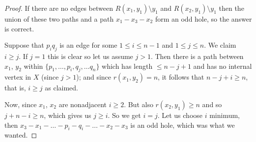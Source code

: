 \begin{proof}
	If there are no edges between $R(x_1, y_1) \setminus y_1$ and $R(x_2, y_1) \setminus y_1$ then the union of these two paths and a path $x_1-x_3-x_2$ form an odd hole, so the answer is correct.

	Suppose that $p_iq_j$ is an edge for some $1\leq i \leq n-1$ and $1 \leq j \leq n$. We claim $i \geq j$. If $j = 1$ this is clear so let us assume $j > 1$. Then there is a path between $x_1$, $y_2$ within $\{p_1, \ldots , p_i, q_j, \ldots q_n\}$ which has length $\leq n-j+1$ and has no internal vertex in $X$ (since $j > 1$); and since $r(x_1, y_2) = n$, it follows that $n-j+i \geq n$, that is, $i \geq j$ as claimed.

	Now, since $x_1$, $x_2$ are nonadjacent $i \geq 2$. But also $r(x_2, y_1) \geq n$ and so $j+n-i \geq n$, which gives us $j \geq i$. So we get $i=j$. Let us choose $i$ minimum, then $x_3-x_1-\ldots-p_i-q_i-\ldots-x_2-x_3$ is an odd hole, which was what we wanted.
\end{proof}




